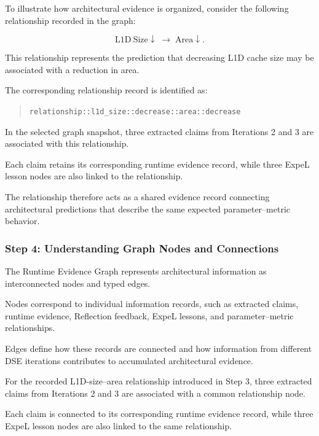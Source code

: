 To illustrate how architectural evidence
is organized, consider the following
relationship recorded in the graph:

\begin{equation}
\mathrm{L1D\ Size}\downarrow
\;\rightarrow\;
\mathrm{Area}\downarrow.
\end{equation}

This relationship represents the prediction
that decreasing L1D cache size may be
associated with a reduction in area.

The corresponding relationship record is
identified as:

\begin{quote}
\texttt{relationship::l1d\_size::decrease::area::decrease}
\end{quote}

In the selected graph snapshot, three
extracted claims from Iterations 2 and 3
are associated with this relationship.

Each claim retains its corresponding
runtime evidence record, while three
ExpeL lesson nodes are also linked
to the relationship.

The relationship therefore acts as a
shared evidence record connecting
architectural predictions that describe
the same expected parameter--metric behavior.



\subsubsection{Step 4: Understanding Graph Nodes and Connections}

The Runtime Evidence Graph represents
architectural information as interconnected
nodes and typed edges.

Nodes correspond to individual information
records, such as extracted claims, runtime
evidence, Reflection feedback, ExpeL lessons,
and parameter--metric relationships.

Edges define how these records are connected
and how information from different DSE
iterations contributes to accumulated
architectural evidence.

For the recorded L1D-size--area relationship
introduced in Step 3, three extracted claims
from Iterations 2 and 3 are associated with
a common relationship node.

Each claim is connected to its corresponding
runtime evidence record, while three ExpeL
lesson nodes are also linked to the same
relationship.

